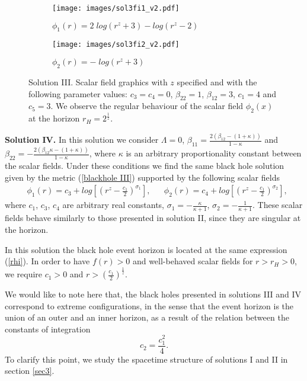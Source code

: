 \documentclass[sn-mathphys,Numbered]{sn-jnl}%
\theoremstyle{thmstyleone}%
\theoremstyle{thmstyletwo}%
\theoremstyle{thmstylethree}%
\begin{document}
\begin{figure}[]

\begin{subfigure}{0.5\textwidth}
\texttt{[image: images/sol3fi1\_v2.pdf]} 
\caption{$\phi_1(r)=2\;log\left(r^z+3\right)-log\left(r^z-2\right)$}
\label{fig:subim3}
\end{subfigure}
\begin{subfigure}{0.5\textwidth}
\texttt{[image: images/sol3fi2\_v2.pdf]}
\caption{$\phi_2(r)=- \;log\left(r^z+3\right)$}
\label{fig:subim4}
\end{subfigure}

\caption{Solution III. Scalar field graphics with $z$ specified and with the following parameter values: $c_3=c_4=0$, $\beta_{22}=1$, $\beta_{12}=3$, $c_1=4$ and $c_5=3$. We observe the regular behaviour of the scalar field $\phi_2(x)$  at the horizon $r_H=2^{\frac{1}{z}}$.}
\label{fig:sol3}
\end{figure}

\textbf{Solution IV.}
In this solution we consider $\Lambda= 0$, $\beta_{11} = \frac{2\left(\beta_{12} -\left(1+\kappa \right)\right)}{1 -\kappa}$ and $\beta_{22}=-\frac{2\left(\beta_{12} \kappa - \left(1+\kappa\right) \right)}{1-\kappa}$, where $\kappa$ is an arbitrary proportionality constant between the scalar fields. Under these conditions we find the same black hole solution given by the metric (\ref{blackhole III}) supported by the following scalar fields
\begin{align}
    &\phi_1(r) = c_3 + log\left[\left(r^z - \frac{c_1}{2} \right)^{\sigma_1}\right], & &\phi_2(r) = c_4 + log\left[\left(r^z - \frac{c_1}{2} \right)^{\sigma_2}\right],
\end{align}
where $c_1$, $c_3$, $c_4$ are arbitrary real constants, $\sigma_1=- \frac{\kappa}{\kappa +1}$,  $\sigma_2=- \frac{1}{\kappa + 1}$. %
These scalar fields behave similarly to those presented in solution II, since they are singular at the horizon. 

In this solution the black hole event horizon is located at the same expression (\ref{rhi}).
In order to have $f(r)>0$ and well-behaved scalar fields for $r> r_H> 0$, we require $c_1 > 0$ and $r > \left(\frac{c_1}{2}\right)^{\frac{1}{z}}$.

We would like to note here that, the black holes presented in solutions III and IV correspond to extreme configurations, in the sense that the event horizon is the union of an outer and an inner horizon, as a result of the relation between the constants of integration
%
\begin{equation}\label{extrem relation}
    c_2=\frac{c_1^2}{4}.
\end{equation}
%
To clarify this point, we study the spacetime structure of solutions I and II in section \ref{sec3}. 
\end{document}

